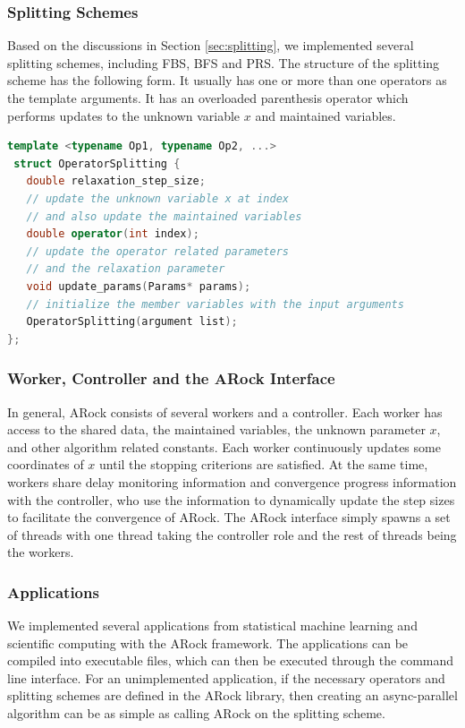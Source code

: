 \newpage
\subsubsection{Splitting Schemes}
Based on the discussions in Section \ref{sec:splitting}, we implemented several splitting schemes, including FBS, BFS and PRS. The structure of the splitting scheme has the following form. It usually has one or more than one operators as the template arguments. It has an overloaded parenthesis operator which performs updates to the unknown variable $x$ and maintained variables. 
 \begin{lstlisting}[language=c++]
 template <typename Op1, typename Op2, ...>
 struct OperatorSplitting {
   double relaxation_step_size;
   // update the unknown variable x at index
   // and also update the maintained variables   
   double operator(int index);
   // update the operator related parameters
   // and the relaxation parameter   
   void update_params(Params* params);
   // initialize the member variables with the input arguments
   OperatorSplitting(argument list);
};
\end{lstlisting}


\subsubsection{Worker, Controller and the ARock Interface}
In general, ARock consists of several workers and a controller. Each worker has access to the shared data, the maintained variables, the unknown parameter $x$, and other algorithm related constants. Each worker continuously updates some coordinates of $x$ until the stopping criterions are satisfied. At the same time, workers share delay monitoring information and convergence progress information with the controller, who use the information to dynamically update the step sizes to facilitate the convergence of ARock. The ARock interface simply spawns a set of threads with one thread taking the controller role and the rest of threads being the workers. 

\subsubsection{Applications}
We implemented several applications from statistical machine learning and scientific computing with the ARock framework. The applications can be compiled into executable files, which can then be executed through the command line interface. For an unimplemented application, if the necessary operators and splitting schemes are defined in the ARock library, then creating an async-parallel algorithm can be as simple as calling ARock on the splitting scheme.

